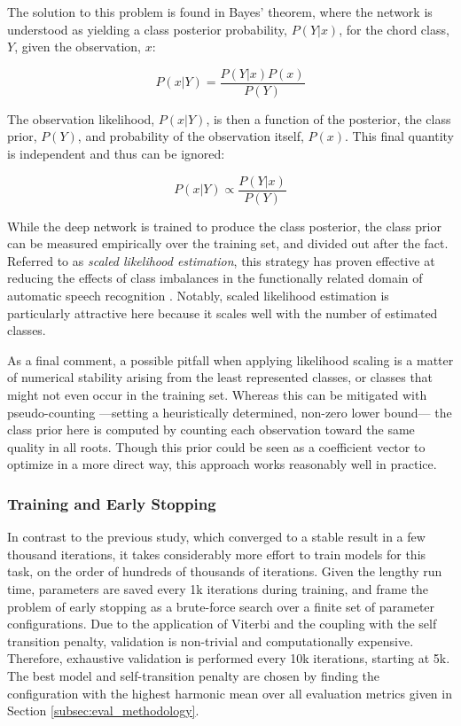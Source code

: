 The solution to this problem is found in Bayes' theorem, where the network is understood as yielding a class posterior probability, $P(Y|x)$, for the chord class, $Y$, given the observation, $x$:

\begin{equation}
P(x|Y) = \frac{P(Y|x)P(x)}{P(Y)}
\end{equation}

The observation likelihood, $P(x|Y)$, is then a function of the posterior, the class prior, $P(Y)$, and probability of the observation itself, $P(x)$.
This final quantity is independent and thus can be ignored:

\begin{equation}
P(x|Y) \varpropto \frac{P(Y|x)}{P(Y)}
\end{equation}

While the deep network is trained to produce the class posterior, the class prior can be measured empirically over the training set, and divided out after the fact.
Referred to as \emph{scaled likelihood estimation}, this strategy has proven effective at reducing the effects of class imbalances in the functionally related domain of automatic speech recognition \cite{Dahl2012Context}.
Notably, scaled likelihood estimation is particularly attractive here because it scales well with the number of estimated classes.

As a final comment, a possible pitfall when applying likelihood scaling is a matter of numerical stability arising from the least represented classes, or classes that might not even occur in the training set.
Whereas this can be mitigated with pseudo-counting ---setting a heuristically determined, non-zero lower bound--- the class prior here is computed by counting each observation toward the same quality in all roots.
Though this prior could be seen as a coefficient vector to optimize in a more direct way, this approach works reasonably well in practice.


\subsubsection{Training and Early Stopping}
\label{subsubsec:early_stopping}

In contrast to the previous study, which converged to a stable result in a few thousand iterations, it takes considerably more effort to train models for this task, on the order of hundreds of thousands of iterations.
Given the lengthy run time, parameters are saved every 1k iterations during training, and frame the problem of early stopping as a brute-force search over a finite set of parameter configurations.
Due to the application of Viterbi and the coupling with the self transition penalty, validation is non-trivial and computationally expensive.
Therefore, exhaustive validation is performed every 10k iterations, starting at 5k.
The best model and self-transition penalty are chosen by finding the configuration with the highest harmonic mean over all evaluation metrics given in Section \ref{subsec:eval_methodology}.



